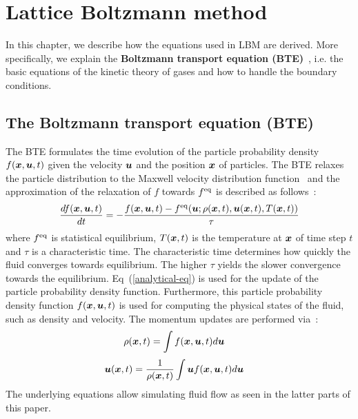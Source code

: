 \chapter{Lattice Boltzmann method}
\vspace{-8mm}
In this chapter, we describe how the equations used in LBM
are derived.
More specifically, we explain
the {\bf Boltzmann transport equation (BTE)}~\cite{mcnamara1988use}, i.e.
the basic equations of the kinetic theory of gases and
how to handle the boundary conditions.

\section{The Boltzmann transport equation (BTE)}
The BTE formulates the time evolution of the 
particle probability density $f(\boldsymbol{x}, \boldsymbol{u}, t)$ given
the velocity $\boldsymbol{u}$ and the position $\boldsymbol{x}$ of particles.
The BTE relaxes the particle distribution to
the Maxwell velocity distribution
function~\cite{huang1963statistical} and the approximation of the relaxation of
$f$ towards $f^{\rm eq}$ is described as follows~\cite{bhatnagar1954model}:
\begin{equation}
  \begin{aligned}
    \frac{d f(\boldsymbol{x}, \boldsymbol{u}, t)}{d t} &= 
    - \frac{
      f(\boldsymbol{x}, \boldsymbol{u}, t) - f^{\rm eq}(\boldsymbol{u}; \rho(\boldsymbol{x}, t), \boldsymbol{u}(\boldsymbol{x}, t), T(\boldsymbol{x}, t))
      }{\tau} \\
    \end{aligned}
    \label{analytical-eq}
  \end{equation}
where $f^{\rm eq}$ is statistical equilibrium,
$T(\boldsymbol{x}, t)$ is the temperature at $\boldsymbol{x}$
of time step $t$ and
$\tau$ is a characteristic time.
The characteristic time determines how quickly
the fluid converges towards equilibrium.
The higher $\tau$ yields the slower 
convergence towards the equilibrium.
Eq~(\ref{analytical-eq}) is used for the update 
of the particle probability density function.
Furthermore, this particle probability density function
$f(\boldsymbol{x}, \boldsymbol{u}, t)$ is used for computing
the physical states of the fluid,
such as density and velocity.
The momentum updates are performed via~\cite{caroli1984non}:
\begin{equation}
  \begin{aligned}
    \rho(\boldsymbol{x}, t) &= \int f(\boldsymbol{x}, \boldsymbol{u}, t) d\boldsymbol{u} 
  \end{aligned}
  \label{density-analytical-update}
\end{equation}
\begin{equation}
\begin{aligned}
  \boldsymbol{u}(\boldsymbol{x}, t) &= \frac{1}{\rho(\boldsymbol{x}, t)} \int \boldsymbol{u} f(\boldsymbol{x}, \boldsymbol{u}, t)  d\boldsymbol{u}
\end{aligned}
\label{velocity-analytical-update}
\end{equation}
The underlying equations allow simulating
fluid flow as seen in the latter parts of this paper.

